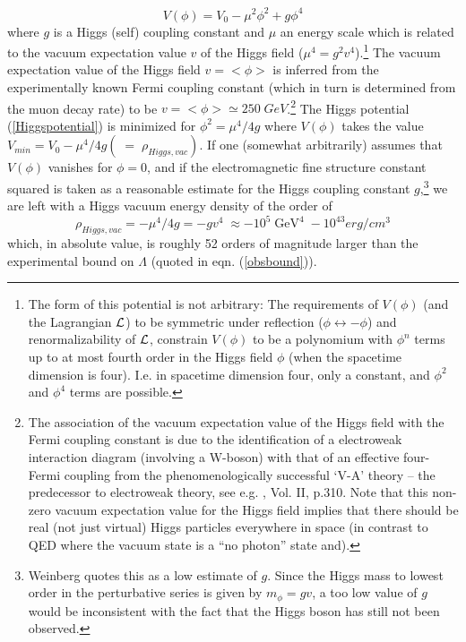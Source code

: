 \documentclass[12pt]{article}
\begin{document}
\begin{equation} \label{Higgspotential}
V(\phi) = V_0 - \mu ^2 \phi ^2 + g\phi ^4
\end{equation}
where $g$ is a Higgs (self) coupling constant and $\mu$ an energy
scale which is related to the vacuum expectation value $v$ of the
Higgs field ($\mu ^4 = g^2 v^4$).\footnote{The form of this potential
is not arbitrary: The requirements of $V(\phi)$ (and the Lagrangian
$\cal{L}$) to be symmetric under reflection ($\phi \leftrightarrow -
\phi$) and renormalizability of $\cal{L}$, constrain
$V(\phi)$ to be a polynomium with $\phi ^n$ terms up to at most fourth
order in the Higgs field $\phi$ (when the spacetime dimension is
four). I.e.  in spacetime dimension four, only a constant, and
$\phi^2$ and $\phi^4$ terms are possible.} The vacuum expectation
value of the Higgs field $v = < \phi >$ is inferred from the
experimentally known Fermi coupling constant (which in turn is
determined from the muon decay rate) to be $v = < \phi > \simeq 250 \;
GeV$.\footnote{The association of the vacuum expectation value of
the Higgs field with the Fermi coupling constant is due to the
identification of a electroweak interaction diagram (involving a
W-boson) with that of an effective four-Fermi coupling from the
phenomenologically successful `V-A' theory -- the predecessor to
electroweak theory, see e.g. \cite{weinberg96}, Vol. II, p.310.
Note that this non-zero vacuum expectation value for the Higgs
field implies that there should be real (not just virtual) Higgs
particles everywhere in space (in contrast to QED where
the vacuum state is a ``no photon'' state and).} The Higgs potential
(\ref{Higgspotential}) is minimized for 
$\phi ^2 = \mu ^4 / 4g$ where $V(\phi)$  takes the value 
$ V_{min} = V_0 - \mu ^4/4g (\; = \; \rho _{Higgs,vac})$.
If one (somewhat arbitrarily) assumes that $V(\phi)$ vanishes 
for $\phi = 0$, and if the 
electromagnetic fine structure constant
squared is taken as a reasonable estimate for the Higgs coupling constant 
$g$,\footnote{Weinberg quotes
this as a low estimate of $g$. Since the Higgs mass to lowest order in
the perturbative series is given by $m_{\phi} = gv$, a too low value
of $g$ would be inconsistent with the fact that the Higgs boson has
still not been observed.} we
are left with a Higgs vacuum energy density of the order of
$$
\rho _{Higgs,vac}= -\mu ^4/ 4g = -gv^4 \; \approx -10^5 \; 
{\mbox{GeV}} ^4 \; -10^{43} erg/cm^3
$$
which, in absolute value, is roughly 52 orders of magnitude larger than
the experimental bound on $\Lambda$ (quoted in eqn.
(\ref{obsbound})).
\end{document}
